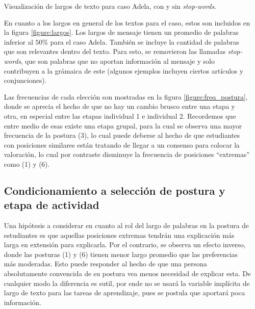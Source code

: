 \documentclass[
	spanish, %
	letterpaper, oneside
]{article}
\begin{document}
\begin{images}[\label{figure:largos}]{Visualización de largos de texto para caso Adela, con y sin \textit{stop-words}.}
\end{images}


En cuanto a los largos en general de los textos para el caso, estos son incluidos en la figura \ref{figure:largos}. Los largos de mensaje tienen un promedio de palabras inferior al $50\%$ para el caso Adela. También se incluye la cantidad de palabras que son relevantes dentro del texto. Para esto, se removieron las llamadas \textit{stop-words}, que son palabras que no aportan información al mensaje y solo contribuyen a la grámaica de este (algunos ejemplos incluyen ciertos artículos y conjunciones). 

\newp Las frecuencias de cada elección son mostradas en la figura \ref{figure:freq_postura}, donde se aprecia el hecho de que no hay un cambio brusco entre una etapa y otra, en especial entre las etapas individual 1 e individual 2. Recordemos que entre medio de esas existe una etapa grupal, para la cual se observa una mayor frecuencia de la postura (3), lo cual puede deberse al hecho de que estudiantes con posiciones similares están tratando de llegar a un consenso para colocar la valoración, lo cual por contraste disminuye la frecuencia de posiciones ``extremas'' como (1) y (6).

\subsection{Condicionamiento a selección de postura y etapa de actividad}

Una hipótesis a considerar en cuanto al rol del largo de palabras en la postura de estudiantes es que aquellas posiciones extremas tendrán una explicación más larga en extensión para explicarla. Por el contrario, se observa un efecto inverso, donde las posturas (1) y (6) tienen menor largo promedio que las preferencias más moderadas. Esto puede responder al hecho de que una persona absolutamente convencida de su postura vea menos necesidad de explicar esta. De cualquier modo la diferencia es sutil, por ende no se usará la variable implícita de largo de texto para las tareas de aprendizaje, pues se postula que aportará poca información.
\end{document}
